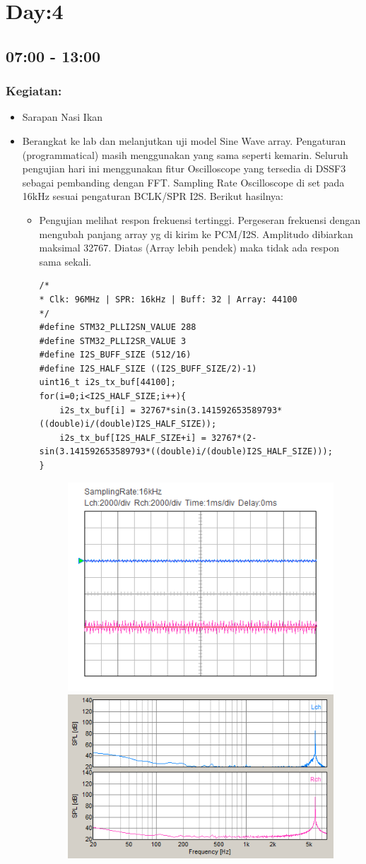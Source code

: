 \documentclass[12pt,]{article}
\begin{document}
	\newpage
	\section{Day:4}
	\subsection{07:00 - 13:00}
	\subsubsection{Kegiatan:}
	\begin{itemize}
		\item Sarapan Nasi Ikan
		\item Berangkat ke lab dan melanjutkan uji model Sine Wave array.
		Pengaturan (programmatical) masih menggunakan yang sama seperti kemarin.
		Seluruh pengujian hari ini menggunakan fitur Oscilloscope yang tersedia di DSSF3 
		sebagai pembanding dengan FFT.
		Sampling Rate Oscilloscope di set pada 16kHz sesuai pengaturan BCLK/SPR I2S.
		Berikut hasilnya:
		\begin{itemize}
			\item Pengujian melihat respon frekuensi tertinggi.
			Pergeseran frekuensi dengan mengubah panjang array yg di kirim ke PCM/I2S.
			Amplitudo dibiarkan maksimal 32767.
			Diatas (Array lebih pendek) maka tidak ada respon sama sekali.
			\begin{verbatim}
/*
* Clk: 96MHz | SPR: 16kHz | Buff: 32 | Array: 44100
*/
#define STM32_PLLI2SN_VALUE 288
#define STM32_PLLI2SR_VALUE 3
#define I2S_BUFF_SIZE (512/16)
#define I2S_HALF_SIZE ((I2S_BUFF_SIZE/2)-1)
uint16_t i2s_tx_buf[44100];
for(i=0;i<I2S_HALF_SIZE;i++){
	i2s_tx_buf[i] = 32767*sin(3.141592653589793*((double)i/(double)I2S_HALF_SIZE));
	i2s_tx_buf[I2S_HALF_SIZE+i] = 32767*(2-sin(3.141592653589793*((double)i/(double)I2S_HALF_SIZE)));
}
		\end{verbatim}
		\begin{figure}[H]
			\centering
			\includegraphics[width=0.45\linewidth]{result/day_3/osi_highest_fr}
			\includegraphics[width=0.45\linewidth]{result/day_3/fft_highest_fr}
		\end{figure}
		

\end{itemize}
\end{itemize}
\end{document}
